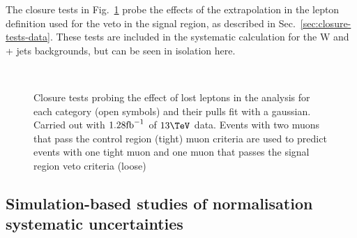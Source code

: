 The closure tests in Fig.~\ref{fig:closureLooseLep} probe the effects
of the extrapolation in the lepton definition used for the veto in the
signal region, as described in Sec.~\ref{sec:closure-tests-data}.
These tests are included in the systematic calculation for the W and
\ttbar + jets backgrounds, but can be seen in isolation here. 

\begin{figure}
  \begin{center}
    ~~
    \caption{Closure tests probing the effect of lost leptons in the
    analysis for each
    \njet category (open symbols) and their pulls fit with a gaussian. Carried out with $1.28\text{fb}^{-1}$ of
      $13\tev$ data. Events with two muons that pass the control
      region (tight) muon criteria are used to predict events with one
      tight muon and one muon that passes the signal region veto
      criteria (loose)}
    \label{fig:closureLooseLep}
  \end{center} 
\end{figure}


\subsection{Simulation-based studies of normalisation systematic uncertainties}
\label{sec:mc-systematics}


